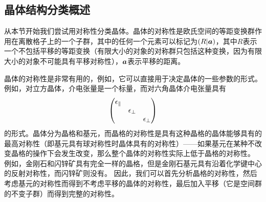 \subsection{晶体结构分类概述}\label{sec:crystal-structure-intro}

从本节开始我们尝试用对称性分类晶体。晶体的对称性是欧氏空间的等距变换群作用在离散格子上的一个子群，其中的任何一个元素可以标记为$(R|\vb*{a})$，其中$R$表示一个不包括平移的等距变换（有限大小的对象的对称群只包括这种变换，因为有限大小的对象不可能具有平移对称性），$\vb*{a}$表示平移的距离。

晶体的对称性是非常有用的，例如，它可以直接用于决定晶体的一些参数的形式。例如，对立方晶体，介电张量是一个标量，而对六角晶体介电张量具有
\[
    \pmqty{\dmat{\epsilon_\parallel, \epsilon_\bot, \epsilon_\bot}}
\]
的形式。晶体分为晶格和基元，而晶格的对称性是具有这种晶格的晶体能够具有的最高对称性（即基元具有球对称性时晶体具有的对称性）——如果基元在某种不改变晶格的操作下会发生改变，那么整个晶体的对称性实际上低于晶格的对称性。
例如，金刚石和闪锌矿具有完全一样的晶格，但是金刚石基元具有沿着化学键中心的反射对称性，而闪锌矿则没有。 %
因此，我们可以首先分析晶格的对称性，然后考虑基元的对称性而得到不考虑平移的晶体的对称性，最后加入平移（它是空间群的不变子群）而得到完整的对称性。

